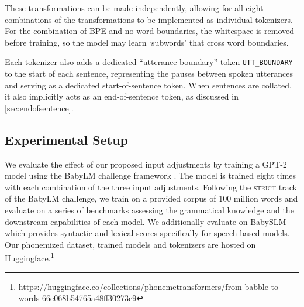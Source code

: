 


These transformations can be made independently, allowing for all eight combinations of the transformations to be implemented as individual tokenizers. For the combination of BPE and no word boundaries, the whitespace is removed before training, so the model may learn `subwords' that cross word boundaries.

Each tokenizer also adds a dedicated ``utterance boundary'' token \texttt{UTT\_BOUNDARY} to the start of each sentence, representing the pauses between spoken utterances and serving as a dedicated start-of-sentence token. When sentences are collated, it also implicitly acts as an end-of-sentence token, as discussed in \cref{sec:endofsentence}.

\subsection{Experimental Setup}

We evaluate the effect of our proposed input adjustments by training a GPT-2 model \citep{radford-2019-gpt2} using the BabyLM challenge framework \citep{choshen-et-al-2024-callforpapers-babylm2}. The model is trained eight times with each combination of the three input adjustments. Following the \textsc{strict} track of the BabyLM challenge, we train on a provided corpus of 100 million words and evaluate on a series of benchmarks assessing the grammatical knowledge and the downstream capabilities of each model. We additionally evaluate on BabySLM \citep{lavechin} which provides syntactic and lexical scores specifically for speech-based models. Our phonemized dataset, trained models and tokenizers are hosted on Huggingface.\footnote{\url{https://huggingface.co/collections/phonemetransformers/from-babble-to-words-66e068b54765a48ff30273c9}}


